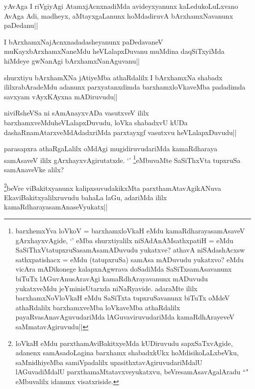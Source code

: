 \begin{artha}
yAvAga I riVgiyAgi AtamxjAcnxnadiMda avideyxyanunx kaLedukoLuLxvano AvAga Adi, madheyx, aMtayxgaLanunx hoMdadiruvA bArxhamxNavanunx paDedanu||
\end{artha}

\begin{artha}
I bArxhamxNajAcnxnadadasheyanunx paDedavaneV muKayxbArxhamxNaneMdu heVLalapxDuvanu muMdina daqSiTxyiMda hiMdeye gwNanAgi bArxhamxNanAguvanu||
\end{artha}


\begin{artha}
shurxtiyu bArxhamXNa jAtiyeMba athaRdalilx I bArxhamxNa shabadx ililxrabAradeMdu adanunx parxyatanxdimda barxhamxloVkaveMba padadimda savxyam vAyxKAyxna mADiruvudu||
\end{artha}


\begin{artha}
niviRsheVSa ni sAmAnayxvADa vasutxveV ililx barxhamxveMduheVLalapxDuvudu, loVka shabadxvU kUDa dashaRnamAtarxveMdAdadxriMda parxtayxgf vasutxvu heVLalapxDuvudu||
\end{artha}



\begin{artha}
parasapxra athaRgaLalilx oMdAgi mugidiruvudariMda kamaRdharaya samAsaveV ililx gArxhayxvAgirutatxde. `\stext' \footnote{barxhemxYva loVkoV = barxhamxloVkaH eMdu kamaRdharayasamAsaveV gArxhayxvAgide, `\stext' eMba shurxtiyalilx niSAdAnAMsathxpatiH = eMdu SaSiThxVtatupxruSasamAsamADuvudu yukatxve? athavA niSAdashAcxsw sathxpatishacx = eMdu (tatupxruSa) samAsa mADuvudu yukatxvo? eMdu vicAra mADikonege kalapxnAgwrava doSadiMda SaSiTxsamAsavanunx biTuTx lAGuvAnusAravAgi kamaRdhArayavanunx mADuvudu yukatxveMdu jeYminisUtarxda niNaRyavide. adaraMte ililx barxhamxNoVloVkaH eMdu SaSiTxta tupxruSavanunx biTuTx oMdeV athaRdalilx barxhamxveMba loVkaveMba athaRdalilx payaRvasAnavAguvudariMda lAGuvaviruvudariMda kamaRdhArayeveV saMmatavAgiruvudu||}eMbuvaMte SaSiThxVta tupxruSa samAnaveVke alilx?
\end{artha}

\begin{artha}
\footnote{loVkaH eMdu parxthamAviBakitxyeMda kUDiruvudu sapxSaTxvAgide, adanenx samAsadoLagina barxhamx shabadxkUkx hoMdisikoLaLxbeVku, saMnidhiyeMba samiVpadalilx upasithxtavAgiruvudariMdalU lAGuvadiMdalU parxthamaMtatavxveyukatxvu, beVresamAsavAgalAradu ``\stext" eMbuvalilx idanunx visatxriside.}beVre viBakitxyanunx kalipxsuvudakikxMta parxthamAtavAgikANuva EkaviBakitxyalilxruvudu bahaLa laGu, adariMda ililx kamaRdharayasamAnaseVyukatx||
\end{artha}

